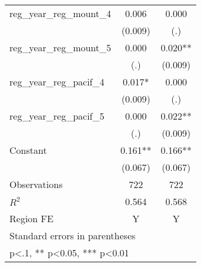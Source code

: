 \begin{table}[htbp]
\begin{tabular}{l*{2}{c}}
\addlinespace
reg\_year\_reg\_mount\_4&    0.006   &    0.000   \\
                    &  (0.009)   &      (.)   \\
\addlinespace
reg\_year\_reg\_mount\_5&    0.000   &    0.020** \\
                    &      (.)   &  (0.009)   \\
\addlinespace
reg\_year\_reg\_pacif\_4&    0.017*  &    0.000   \\
                    &  (0.009)   &      (.)   \\
\addlinespace
reg\_year\_reg\_pacif\_5&    0.000   &    0.022** \\
                    &      (.)   &  (0.009)   \\
\addlinespace
Constant            &    0.161** &    0.166** \\
                    &  (0.067)   &  (0.067)   \\
\midrule
Observations        &      722   &      722   \\
\(R^{2}\)           &    0.564   &    0.568   \\
Region FE           &        Y   &        Y   \\
\bottomrule
\multicolumn{3}{l}{\footnotesize Standard errors in parentheses}\\
\multicolumn{3}{l}{\footnotesize * p<.1, ** p<0.05, *** p<0.01}\\
\end{tabular}
\end{table}
